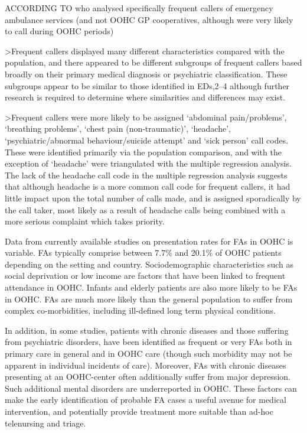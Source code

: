 ACCORDING TO \cite{scott2014describing}
who analysed specifically frequent callers of emergency ambulance services (and not OOHC GP cooperatives, although were very likely to call during OOHC periods)

>Frequent callers displayed many different characteristics compared with the population, and there appeared to be different subgroups of frequent callers based broadly on their primary medical diagnosis or psychiatric classification. These subgroups appear to be similar to those identified in EDs,2–4 although further research is required to determine where similarities and differences may exist.

>Frequent callers were more likely to be assigned ‘abdominal pain/problems’, ‘breathing problems’, ‘chest pain (non-traumatic)’, ‘headache’, ‘psychiatric/abnormal behaviour/suicide attempt’ and ‘sick person’ call codes. These were identified primarily via the population comparison, and with the exception of ‘headache’ were triangulated with the multiple regression analysis. The lack of the headache call code in the multiple regression analysis suggests that although headache is a more common call code for frequent callers, it had little impact upon the total number of calls made, and is assigned sporadically by the call taker, most likely as a result of headache calls being combined with a more serious complaint which takes priority.








Data from currently available studies on presentation rates for FAs in
OOHC is variable. FAs typically comprise between 7.7\% and 20.1\% of OOHC patients depending on the setting and country.\cite{leutgeb2018patients} Sociodemographic characteristics such as social deprivation or low income are factors that have been linked to frequent attendance in OOHC. Infants and elderly patients are also more likely to be FAs in OOHC. FAs are much more likely than the general population to suffer from complex co-morbidities, including ill-defined long term physical conditions. \cite{patel2015clinical} 

In addition, in some studies, patients with chronic diseases and those suffering from psychiatric disorders, have been identified as frequent or very FAs both in primary care in general and in OOHC care (though such morbidity may not be apparent in individual incidents of care).\cite{ng2015frequent} Moreover, FAs with chronic diseases presenting at an OOHC-center often additionally suffer from major depression. Such additional mental disorders are underreported in OOHC.\cite{bhroin2019profiling} These factors can make the early identification of probable FA cases a useful avenue for medical intervention, and potentially provide treatment more suitable than ad-hoc telenursing and triage.





